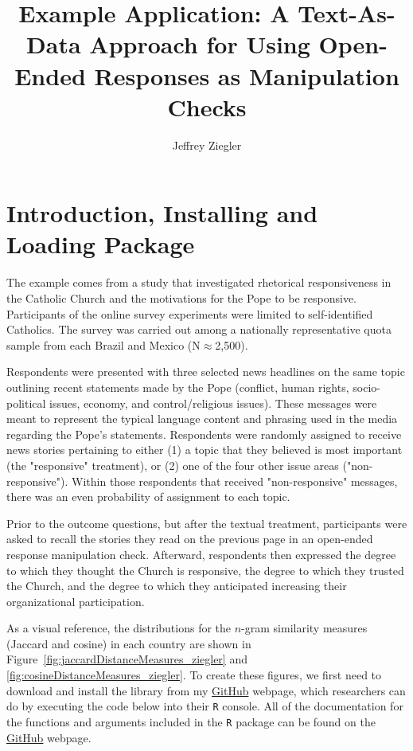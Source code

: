 \documentclass[12pt,letterpaper]{article}
\title{Example Application: A Text-As-Data Approach for Using Open-Ended Responses as Manipulation Checks}
\date{}
\author{Jeffrey Ziegler}
\begin{document}
	\maketitle
	
	\section*{Introduction, Installing and Loading Package}
	
	\noindent The example comes from a study that investigated rhetorical responsiveness in the Catholic Church and the motivations for the Pope to be responsive. Participants of the online survey experiments were limited to self-identified Catholics. The survey was carried out among a nationally representative quota sample from each Brazil and Mexico (N$\approx$2,500).
	
	Respondents were presented with three selected news headlines on the same topic outlining recent statements made by the Pope (conflict, human rights, socio-political issues, economy, and control/religious issues). These messages were meant to represent the typical language content and phrasing used in the media regarding the Pope's statements. Respondents were randomly assigned to receive news stories pertaining to either (1) a topic that they believed is most important (the "responsive" treatment), or (2) one of the four other issue areas ("non-responsive"). Within those respondents that received "non-responsive" messages, there was an even probability of assignment to each topic.
	
	Prior to the outcome questions, but after the textual treatment, participants were asked to recall the stories they read on the previous page in an open-ended response manipulation check. Afterward, respondents then expressed the degree to which they thought the Church is responsive, the degree to which they trusted the Church, and the degree to which they anticipated increasing their organizational participation.
	
	As a visual reference, the distributions for the $n$-gram similarity measures (Jaccard and cosine) in each country are shown in Figure~\ref{fig:jaccardDistanceMeasures_ziegler} and \ref{fig:cosineDistanceMeasures_ziegler}. To create these figures, we first need to download and install the library from my \href{https://github.com/jeffreyziegler/openEnded}{GitHub} webpage, which researchers can do by executing the code below into their \texttt{R} console. All of the documentation for the functions and arguments included in the \texttt{R} package can be found on the \href{https://github.com/jeffreyziegler/openEnded}{GitHub} webpage.
	
\end{document}
